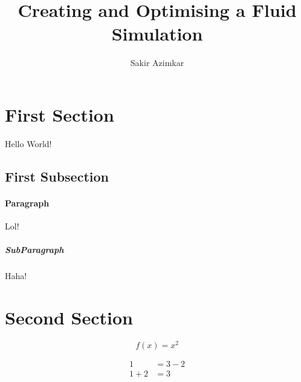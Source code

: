 \documentclass{article}
\title{Creating and Optimising a Fluid Simulation}
\author{Sakir Azimkar}
\begin{document}
    \maketitle
    \newpage
    \tableofcontents
    \newpage
    \listoffigures
    \listoftables
    \newpage

    \section{First Section}
        Hello World!
        \subsection{First Subsection}
            \paragraph{Paragraph}
                Lol!
                \subparagraph{SubParagraph}
                    Haha!

    \section{Second Section}
        \begin{equation}
            f(x) = x^2
        \end{equation}

        \begin{align*}
            1 &= 3 - 2 \\
            1 + 2 &= 3
        \end{align*}
\end{document}
